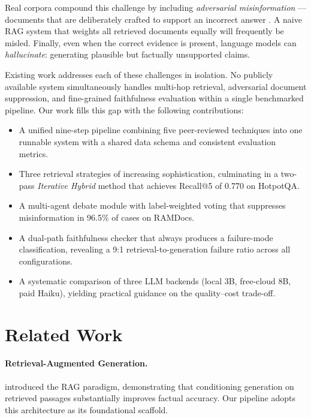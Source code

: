 \documentclass{article}
\begin{document}
Real corpora compound this challenge by including \emph{adversarial
misinformation} — documents that are deliberately crafted to support
an incorrect answer \citep{yoran2024madam}.  A naive RAG system that
weights all retrieved documents equally will frequently be misled.
Finally, even when the correct evidence is present, language models
can \emph{hallucinate}: generating plausible but factually unsupported
claims.

Existing work addresses each of these challenges in isolation.  No
publicly available system simultaneously handles multi-hop retrieval,
adversarial document suppression, and fine-grained faithfulness
evaluation within a single benchmarked pipeline.  Our work fills this
gap with the following contributions:

\begin{itemize}
  \item A unified nine-step pipeline combining five peer-reviewed
        techniques into one runnable system with a shared data schema
        and consistent evaluation metrics.
  \item Three retrieval strategies of increasing sophistication,
        culminating in a two-pass \emph{Iterative Hybrid} method
        that achieves Recall@5 of 0.770 on HotpotQA.
  \item A multi-agent debate module with label-weighted voting that
        suppresses misinformation in 96.5\% of cases on RAMDocs.
  \item A dual-path faithfulness checker that always produces a
        failure-mode classification, revealing a 9:1
        retrieval-to-generation failure ratio across all
        configurations.
  \item A systematic comparison of three LLM backends (local 3B,
        free-cloud 8B, paid Haiku), yielding practical guidance
        on the quality–cost trade-off.
\end{itemize}

\section{Related Work}
\label{sec:related}

\paragraph{Retrieval-Augmented Generation.}
\citet{lewis2020rag} introduced the RAG paradigm, demonstrating that
conditioning generation on retrieved passages substantially improves
factual accuracy.  Our pipeline adopts this architecture as its
foundational scaffold.
\end{document}

